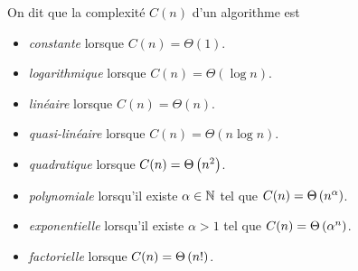 \documentclass{magnolia}
\begin{document}
  \begin{definition}
On dit que la complexité $C(n)$ d'un algorithme est
\begin{itemize}
  \item \emph{constante} lorsque $C(n) = \Theta(1)$.
  \item \emph{logarithmique} lorsque $C(n)=\Theta(\log n)$.
  \item \emph{linéaire} lorsque $C(n)=\Theta(n)$.
  \item \emph{quasi-linéaire} lorsque $C(n)=\Theta(n\log n)$.
  \item \emph{quadratique} lorsque $C(n)=\Theta\left(n^2\right)$.
  \item \emph{polynomiale} lorsqu'il existe $\alpha\in\mathbb{N}$ tel que $C(n)=\Theta\left(n^\alpha\right)$.
  \item \emph{exponentielle} lorsqu'il existe $\alpha>1$ tel que $C(n)=\Theta\left(\alpha^n\right)$.
  \item \emph{factorielle} lorsque $C(n)=\Theta\left(n!\right)$.
\end{itemize}
\end{definition}
  
\end{document}
